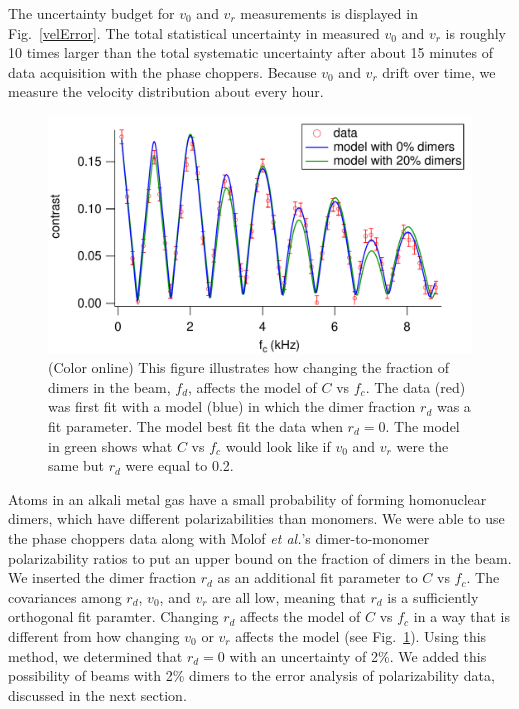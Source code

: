 \documentclass[twocolumn,prl,showpacs,superscriptaddress,longbibliography]{revtex4-1}   %
\newcommand{\figref}[1]{Fig.~\ref{#1}}
\newcommand{\etal}{\textit{et al.}}
\begin{document}
The uncertainty budget for $v_0$ and $v_r$ measurements is displayed in \figref{velError}. 
The total statistical uncertainty in measured $v_0$ and $v_r$ is roughly 10 times larger than the total systematic uncertainty after about 15 minutes of data acquisition with the phase choppers.
Because $v_0$ and $v_r$ drift over time, we measure the velocity distribution about every hour. 

\begin{figure}
\includegraphics[width=\linewidth,keepaspectratio]{CvCFDimers_140924.pdf}
\caption{\label{CvCFDimers}(Color online) This figure illustrates how changing the fraction of dimers in the beam, $f_d$, affects the model of $C$ vs $f_c$. The data (red) was first fit with a model (blue) in which the dimer fraction $r_d$ was a fit parameter. The model best fit the data when $r_d = 0$. The model in green shows what $C$ vs $f_c$ would look like if $v_0$ and $v_r$ were the same but $r_d$ were equal to 0.2.}
\end{figure}

Atoms in an alkali metal gas have a small probability of forming homonuclear dimers, which have different polarizabilities than monomers. 
We were able to use the phase choppers data along with Molof \etal's dimer-to-monomer polarizability ratios \cite{Molof1974} to put an upper bound on the fraction of dimers in the beam. We inserted the dimer fraction $r_d$ as an additional fit parameter to $C$ vs $f_c$.
The covariances among $r_d$, $v_0$, and $v_r$ are all low, meaning that $r_d$ is a sufficiently orthogonal fit paramter. Changing $r_d$ affects the model of $C$ vs $f_c$ in a way that is different from how changing $v_0$ or $v_r$ affects the model (see \figref{CvCFDimers}). 
Using this method, we determined that $r_d = 0$ with an uncertainty of 2\%. We added this possibility of beams with 2\% dimers to the error analysis of polarizability data, discussed in the next section.
\end{document}
